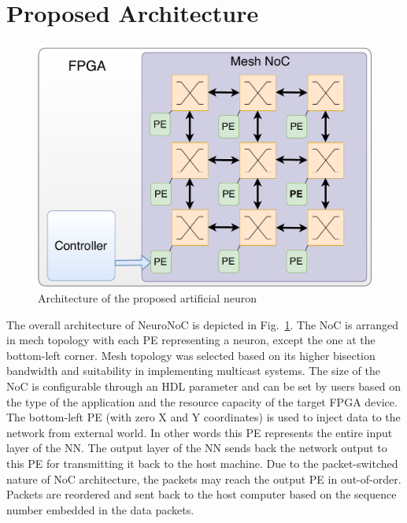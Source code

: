 \section{Proposed Architecture}

\begin{figure}
    \centering
    \includegraphics[width =0.8\columnwidth]{Figures/NeuroNoC.pdf}
    \caption{Architecture of the proposed artificial neuron}
    \label{fig:neuronoc}
\end{figure}

The overall architecture of NeuroNoC is depicted in Fig.~\ref{fig:neuronoc}.
The NoC is arranged in mech topology with each PE representing a neuron, except the one at the bottom-left corner.
Mesh topology was selected based on its higher bisection bandwidth and suitability in implementing multicast systems. 
The size of the NoC is configurable through an HDL parameter and can be set by users based on the type of the application and the resource capacity of the target FPGA device.
The bottom-left PE (with zero X and Y coordinates) is used to inject data to the network from external world.
In other words this PE represents the entire input layer of the NN.
The output layer of the NN sends back the network output to this PE for transmitting it back to the host machine.
Due to the packet-switched nature of NoC architecture, the packets may reach the output PE in out-of-order.
Packets are reordered and sent back to the host computer based on the sequence number embedded in the data packets.

